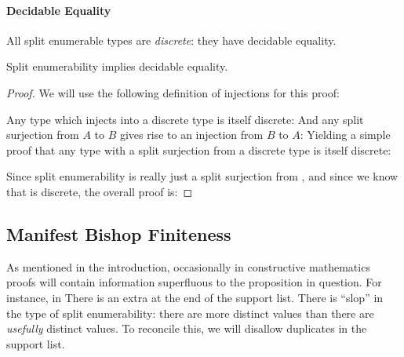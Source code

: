 \paragraph{Decidable Equality}
All split enumerable types are \emph{discrete}: they have decidable equality. 
\begin{paracol}{2} 
\switchcolumn%
\end{paracol}
\begin{lemma}\label{split-enum-discrete}
  Split enumerability implies decidable equality.
\end{lemma}
\begin{proof}
  We will use the following definition of injections for this proof:
  \begin{paracol}{2}
    \switchcolumn%
  \end{paracol}

  Any type which injects into a discrete type is itself discrete:
  And any split surjection from \(A\) to \(B\) gives rise to an injection from
  \(B\) to \(A\):
  Yielding a simple proof that any type with a split surjection from a discrete
  type is itself discrete:

  Since split enumerability is really just a split surjection from
  , and since we know that  is discrete, the
  overall proof is:
\end{proof}

\subsection{Manifest Bishop Finiteness}\label{manifest-bishop-finiteness}
As mentioned in the introduction, occasionally in constructive mathematics
proofs will contain information superfluous to the proposition in question.
For instance, in 
There is an extra  at the end of the support
list.
There is ``slop'' in the type of split enumerability: there are more distinct
values than there are \emph{usefully} distinct values.
To reconcile this, we will disallow duplicates in the support list.

